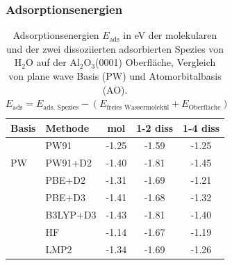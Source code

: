 \documentclass[hyperref={pdfpagelabels=false}]{beamer}
\begin{document}
\begin{frame}
 \frametitle{Adsorptionsenergien}
 \begin{table}[!h]
  \centering
   \caption{Adsorptionsenergien $E_\textrm{ads}$ in eV der molekularen und der zwei dissoziierten adsorbierten Spezies von H$_2$O auf der Al$_2$O$_3$(0001) Oberfläche, Vergleich von plane wave Basis (PW) und Atomorbitalbasis (AO).
   $E_{\textrm{ads}}=E_{\textrm{ads. Spezies}}-(E_{\textrm{freies Wassermolekül}}+E_{\textrm{Oberfläche}})$}
  \begin{tabular}{ll|ccc}%
  \toprule
Basis& Methode & mol & 1-2 diss & 1-4 diss\\\midrule
  \multirow{3}{1cm}{PW}&PW91 &{\color{orange}-1.25} &-1.59 &{\color{orange}-1.25} \\
  &PW91+D2&-1.40 &-1.81 &{\color{red}-1.45} \\
  &PBE+D2 & {\color{red}-1.31} & -1.69 & -1.21 \\
  \midrule \pause
  \multirow{4}{1cm}{AO}&PBE+D3 &{\color{red}-1.41} &-1.68 &-1.32 \\
  &B3LYP+D3 &{\color{red}-1.43} &-1.81 &-1.40 \\
  &HF &-1.14 &-1.67 &{\color{red}-1.19} \\
  &LMP2 &{\color{red}-1.34} & -1.69&-1.26\\
  \bottomrule
  \end{tabular}
 \end{table}
\end{frame}
\end{document}
